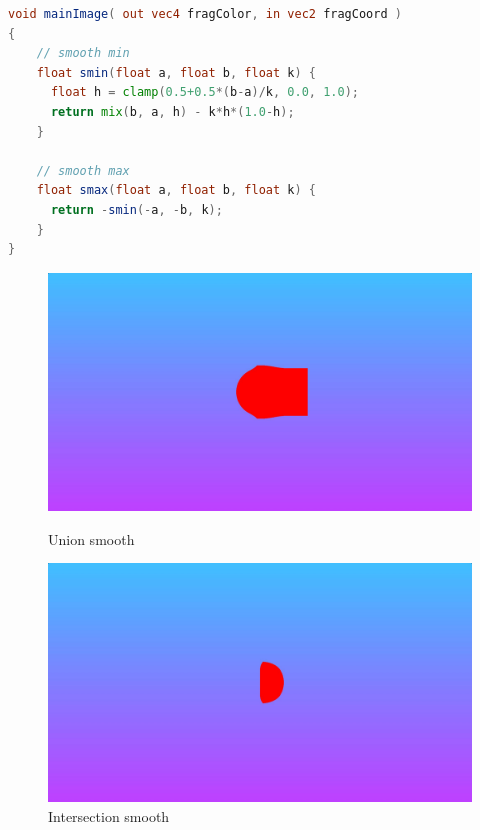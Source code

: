 \begin{minipage}{\linewidth}
\begin{lstlisting}[language=GLSL, caption=Smoothness,captionpos=b,frame=single]
void mainImage( out vec4 fragColor, in vec2 fragCoord )
{
    // smooth min
    float smin(float a, float b, float k) {
      float h = clamp(0.5+0.5*(b-a)/k, 0.0, 1.0);
      return mix(b, a, h) - k*h*(1.0-h);
    }

    // smooth max
    float smax(float a, float b, float k) {
      return -smin(-a, -b, k);
    }
}
\end{lstlisting}
\end{minipage}

\begin{figure}[h]
  \begin{minipage}[b]{0.45\linewidth}
    \centering
    \includegraphics[width=\linewidth]{images/sdf/sdf_op_04.JPG}
    \caption{Union smooth}
    \label{sdf_op_04}
  \end{minipage}
  \hspace{0.1\linewidth} %
  \begin{minipage}[b]{0.45\linewidth}
    \centering
    \includegraphics[width=\linewidth]{images/sdf/sdf_op_05.JPG}
    \caption{Intersection smooth}
    \label{sdf_op_05}
  \end{minipage}
\end{figure}


